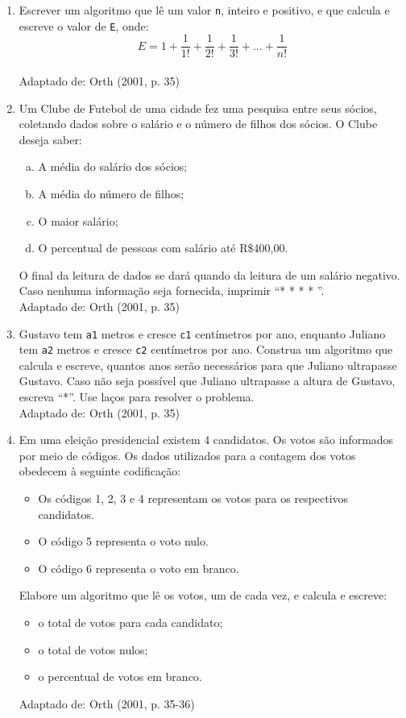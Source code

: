 \documentclass[onecolumn,a4paper,10pt]{report}
\newcommand{\+}{\, + \,}
\newcommand{\<}{\hspace*{-0.4cm}}
\begin{document}
\begin{enumerate}[1.]
\item Escrever um algoritmo que lê um valor \texttt{n}, inteiro e positivo, e que calcula e escreve o valor de \texttt{E}, onde:
\[E = 1 + \frac{1}{1!} + \frac{1}{2!} + \frac{1}{3!} + ... + \frac{1}{n!} \]\\
{\tiny Adaptado de: Orth (2001, p. 35)}

\item Um Clube de Futebol de uma cidade fez uma pesquisa entre seus sócios, coletando dados sobre o salário e o número de filhos dos sócios. O Clube deseja saber:
\begin{enumerate}[a)]
    \item A média do salário dos sócios;
    \item A média do número de filhos;
    \item O maior salário;
    \item O percentual de pessoas com salário até R\$400,00.
\end{enumerate}
O final da leitura de dados se dará quando da leitura de um salário negativo. Caso nenhuma informação seja fornecida, imprimir ``* * * * ''.\\
{\tiny Adaptado de: Orth (2001, p. 35)}

\item Gustavo tem \texttt{a1} metros e cresce \texttt{c1} centímetros por ano, enquanto Juliano tem \texttt{a2} metros e cresce \texttt{c2} centímetros por ano. Construa um algoritmo que calcula e escreve, quantos anos serão necessários para que Juliano ultrapasse Gustavo. Caso não seja possível que Juliano ultrapasse a altura de Gustavo, escreva ``*''. Use laços para resolver o problema.\\
{\tiny Adaptado de: Orth (2001, p. 35)}

\item Em uma eleição presidencial existem 4 candidatos. Os votos são informados por meio de códigos. Os dados utilizados para a contagem dos votos obedecem à seguinte codificação:
\begin{itemize}
    \item Os códigos 1, 2, 3 e 4 representam os votos para os respectivos candidatos.
    \item O código 5 representa o voto nulo.
    \item O código 6 representa o voto em branco.
\end{itemize}
Elabore um algoritmo que lê os votos, um de cada vez, e calcula e escreve:
\begin{itemize}
    \item o total de votos para cada candidato;
    \item  o total de votos nulos;
    \item o percentual de votos em branco.
\end{itemize}
{\tiny Adaptado de: Orth (2001, p. 35-36)}


\end{enumerate}
\end{document}
